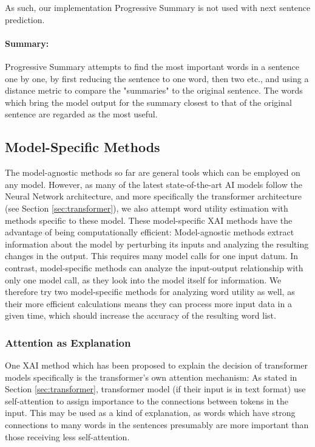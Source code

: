 
As such, our implementation Progressive Summary is not used with next sentence prediction.

\paragraph{Summary:}
Progressive Summary attempts to find the most important words in a sentence one by one, by first reducing the sentence to one word, then two etc., and using a distance metric to compare the "summaries" to the original sentence.
The words which bring the model output for the summary closest to that of the original sentence are regarded as the most useful.

\subsection{Model-Specific Methods}
The model-agnostic methods so far are general tools which can be employed on any model.
However, as many of the latest state-of-the-art AI models follow the Neural Network architecture, and more specifically the transformer architecture (see Section \ref{sec:transformer}), we also attempt word utility estimation with methods specific to these model.
These model-specific XAI methods have the advantage of being computationally efficient:
Model-agnostic methods extract information about the model by perturbing its inputs and analyzing the resulting changes in the output.
This requires many model calls for one input datum.
In contrast, model-specific methods can analyze the input-output relationship with only one model call, as they look into the model itself for information.
We therefore try two model-specific methods for analyzing word utility as well, as their more efficient calculations means they can process more input data in a given time, which should increase the accuracy of the resulting word list.

\subsubsection{Attention as Explanation}
One XAI method which has been proposed to explain the decision of transformer models specifically is the transformer's own attention mechanism:
As stated in Section \ref{sec:transformer}, transformer model (if their input is in text format) use self-attention to assign importance to the connections between tokens in the input.
This may be used as a kind of explanation, as words which have strong connections to many words in the sentences presumably are more important than those receiving less self-attention.


